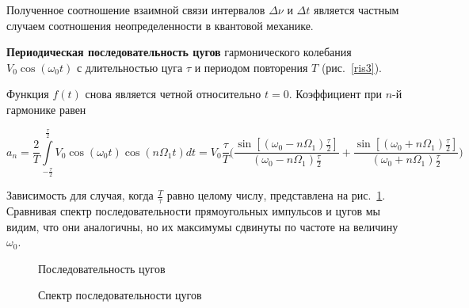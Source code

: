 \documentclass[a4paper, 12pt]{article}
\begin{document}
Полученное соотношение взаимной связи интервалов $\Delta \nu$ и $\Delta t$ является частным случаем соотношения неопределенности в квантовой механике.
	
\textbf{Периодическая последовательность цугов} гармонического колебания $V_{0}\cos(\omega_{0}t)$ с длительностью цуга $\tau$ и периодом повторения $T$ (рис.~\ref{ris3}).
	
Функция $f(t)$ снова является четной относительно $t=0$. Коэффициент при $n$-й гармонике равен
	
$$a_{n}=\dfrac{2}{T}\int\limits_{-\frac{\tau}{2}}^{\frac{\tau}{2}}V_{0}\cos(\omega_{0}t)\cos(n \Omega_{1} t)dt=V_{0}\dfrac{\tau}{T} \bigg(\dfrac{\sin[(\omega_{0}-n\Omega_{1})\frac{\tau}{2}]}{(\omega_{0}-n\Omega_{1})\frac{\tau}{2}}+\dfrac{\sin[(\omega_{0}+n\Omega_{1})\frac{\tau}{2}]}{(\omega_{0}+n\Omega_{1})\frac{\tau}{2}} \bigg)$$ 
	
Зависимость для случая, когда $\frac{T}{\tau}$ равно целому числу, представлена на рис.~\ref{ris4}. Сравнивая спектр последовательности прямоугольных импульсов и цугов мы видим, что они аналогичны, но их максимумы сдвинуты по частоте на величину $\omega_{0}$.
	
\begin{figure}[h]
	\begin{minipage}[h]{0.5\linewidth}
		\caption{Последовательность цугов}
		\label{ris3}
	\end{minipage}
	\begin{minipage}[h]{0.5\linewidth}
		\caption{Спектр последовательности цугов}
		\label{ris4}
	\end{minipage}
\end{figure}
\end{document}
